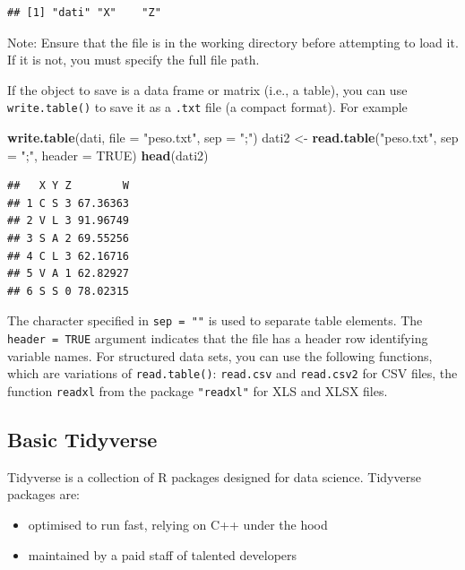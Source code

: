 \documentclass[
]{article}
\newenvironment{Shaded}{\begin{snugshade}}{\end{snugshade}}
\newcommand{\AttributeTok}[1]{\textcolor[rgb]{0.13,0.29,0.53}{#1}}
\newcommand{\ConstantTok}[1]{\textcolor[rgb]{0.56,0.35,0.01}{#1}}
\newcommand{\FunctionTok}[1]{\textcolor[rgb]{0.13,0.29,0.53}{\textbf{#1}}}
\newcommand{\NormalTok}[1]{#1}
\newcommand{\OtherTok}[1]{\textcolor[rgb]{0.56,0.35,0.01}{#1}}
\newcommand{\StringTok}[1]{\textcolor[rgb]{0.31,0.60,0.02}{#1}}
\providecommand{\tightlist}{%
  \setlength{\itemsep}{0pt}\setlength{\parskip}{0pt}}
\begin{document}
\begin{verbatim}
## [1] "dati" "X"    "Z"
\end{verbatim}

Note: Ensure that the file is in the working directory before attempting
to load it. If it is not, you must specify the full file path.

If the object to save is a data frame or matrix (i.e., a table), you can
use \texttt{write.table()} to save it as a \texttt{.txt} file (a compact
format). For example

\begin{Shaded}
\begin{Highlighting}[]
\FunctionTok{write.table}\NormalTok{(dati, }\AttributeTok{file =} \StringTok{"peso.txt"}\NormalTok{, }\AttributeTok{sep =} \StringTok{";"}\NormalTok{)}
\NormalTok{dati2 }\OtherTok{\textless{}{-}} \FunctionTok{read.table}\NormalTok{(}\StringTok{"peso.txt"}\NormalTok{, }\AttributeTok{sep =} \StringTok{";"}\NormalTok{, }\AttributeTok{header =} \ConstantTok{TRUE}\NormalTok{)}
\FunctionTok{head}\NormalTok{(dati2)}
\end{Highlighting}
\end{Shaded}

\begin{verbatim}
##   X Y Z        W
## 1 C S 3 67.36363
## 2 V L 3 91.96749
## 3 S A 2 69.55256
## 4 C L 3 62.16716
## 5 V A 1 62.82927
## 6 S S 0 78.02315
\end{verbatim}

The character specified in \texttt{sep\ =\ ""} is used to separate table
elements. The \texttt{header\ =\ TRUE} argument indicates that the file
has a header row identifying variable names. For structured data sets,
you can use the following functions, which are variations of
\texttt{read.table()}: \texttt{read.csv} and \texttt{read.csv2} for CSV
files, the function \texttt{readxl} from the package \texttt{"readxl"}
for XLS and XLSX files.

\hypertarget{basic-tidyverse}{%
\subsection{Basic Tidyverse}\label{basic-tidyverse}}

Tidyverse is a collection of R packages designed for data science.
Tidyverse packages are:

\begin{itemize}
\tightlist
\item
  optimised to run fast, relying on C++ under the hood
\item
  maintained by a paid staff of talented developers
\end{itemize}
\end{document}
